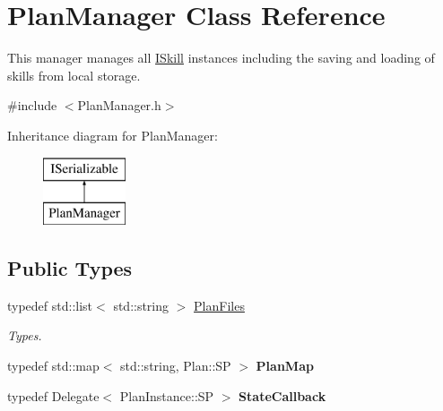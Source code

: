 \hypertarget{class_plan_manager}{}\section{Plan\+Manager Class Reference}
\label{class_plan_manager}


This manager manages all \hyperlink{class_i_skill}{I\+Skill} instances including the saving and loading of skills from local storage.  




{\ttfamily \#include $<$Plan\+Manager.\+h$>$}

Inheritance diagram for Plan\+Manager\+:\begin{figure}[H]
\begin{center}
\leavevmode
\includegraphics[height=2.000000cm]{class_plan_manager}
\end{center}
\end{figure}
\subsection*{Public Types}
\begin{DoxyCompactItemize}
\item 
\mbox{\label{class_plan_manager_a2b39636cced4cfd897b38adc822deaf4}} 
typedef std\+::list$<$ std\+::string $>$ \hyperlink{class_plan_manager_a2b39636cced4cfd897b38adc822deaf4}{Plan\+Files}
\begin{DoxyCompactList}\small\item\em Types. \end{DoxyCompactList}\item 
\mbox{\label{class_plan_manager_a7528c9006b807eddf0d4b7b11caca1d4}} 
typedef std\+::map$<$ std\+::string, Plan\+::\+SP $>$ {\bfseries Plan\+Map}
\item 
\mbox{\label{class_plan_manager_a6d41a8d06e6eb5952743d48b3dad6b86}} 
typedef Delegate$<$ Plan\+Instance\+::\+SP $>$ {\bfseries State\+Callback}
\end{DoxyCompactItemize}
